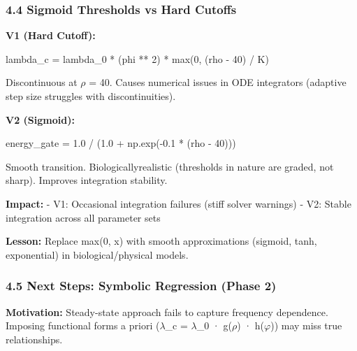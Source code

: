 \documentclass[
]{article}
\newenvironment{Shaded}{}{}
\newcommand{\BuiltInTok}[1]{\textcolor[rgb]{0.00,0.50,0.00}{#1}}
\newcommand{\DecValTok}[1]{\textcolor[rgb]{0.25,0.63,0.44}{#1}}
\newcommand{\FloatTok}[1]{\textcolor[rgb]{0.25,0.63,0.44}{#1}}
\newcommand{\NormalTok}[1]{#1}
\newcommand{\OperatorTok}[1]{\textcolor[rgb]{0.40,0.40,0.40}{#1}}
\begin{document}
\subsubsection{4.4 Sigmoid Thresholds vs Hard
Cutoffs}\label{sigmoid-thresholds-vs-hard-cutoffs}

\textbf{V1 (Hard Cutoff):}

\begin{Shaded}
\begin{Highlighting}[]
\NormalTok{lambda\_c }\OperatorTok{=}\NormalTok{ lambda\_0 }\OperatorTok{*}\NormalTok{ (phi }\OperatorTok{**} \DecValTok{2}\NormalTok{) }\OperatorTok{*} \BuiltInTok{max}\NormalTok{(}\DecValTok{0}\NormalTok{, (rho }\OperatorTok{{-}} \DecValTok{40}\NormalTok{) }\OperatorTok{/}\NormalTok{ K)}
\end{Highlighting}
\end{Shaded}

Discontinuous at $\rho$ = 40. Causes numerical issues in ODE integrators
(adaptive step size struggles with discontinuities).

\textbf{V2 (Sigmoid):}

\begin{Shaded}
\begin{Highlighting}[]
\NormalTok{energy\_gate }\OperatorTok{=} \FloatTok{1.0} \OperatorTok{/}\NormalTok{ (}\FloatTok{1.0} \OperatorTok{+}\NormalTok{ np.exp(}\OperatorTok{{-}}\FloatTok{0.1} \OperatorTok{*}\NormalTok{ (rho }\OperatorTok{{-}} \DecValTok{40}\NormalTok{)))}
\end{Highlighting}
\end{Shaded}

Smooth transition. Biologicallyrealistic (thresholds in nature are
graded, not sharp). Improves integration stability.

\textbf{Impact:} - V1: Occasional integration failures (stiff solver
warnings) - V2: Stable integration across all parameter sets

\textbf{Lesson:} Replace max(0, x) with smooth approximations (sigmoid,
tanh, exponential) in biological/physical models.

\subsubsection{4.5 Next Steps: Symbolic Regression (Phase
2)}\label{next-steps-symbolic-regression-phase-2}

\textbf{Motivation:} Steady-state approach fails to capture frequency
dependence. Imposing functional forms a priori ($\lambda$\_c = $\lambda$\_0 · g($\rho$) ·
h($\varphi$)) may miss true relationships.
\end{document}
